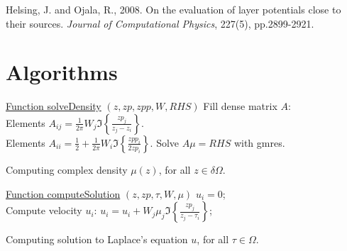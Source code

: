 \documentclass[a4paper,10pt]{article}
\begin{document}
\newpage
\begin{thebibliography}{99}
    Helsing, J. and Ojala, R., 2008. On the evaluation of layer potentials close to their sources. {\em Journal of Computational Physics}, 227(5), pp.2899-2921.
\end{thebibliography}

\newpage
\appendix
\section{Algorithms}
\label{sec:alg}
\begin{algorithm}[ht]

    \underline{Function solveDensity} $(z,zp,zpp,W, RHS)$\;
    \Output{$\mu$}
     {
         {
            Fill dense matrix $A$: \\
                Elements $A_{ij} = \frac{1}{2\pi} W_j \Im\left\{ \frac{zp_j}{z_j - z_i} \right\}$. \\
                Elements $A_{ii} = \frac{1}{2} + \frac{1}{2\pi}W_i \Im\left\{ \frac{zpp_i}{2zp_i} \right\}$.
        }
    }
    Solve $A\mu=RHS$ with gmres.
    \caption{Computing complex density $\mu(z)$, for all $z\in\delta\Omega$.}
    \label{alg:solveDensity}
\end{algorithm}
\begin{algorithm}[ht]

    \underline{Function computeSolution} $(z,zp,\tau,W,\mu)$\;
     {
        $u_i = 0$; \\
         {
            Compute velocity $u_i$: 
            $u_i = u_i + W_j\mu_j\Im\left\{ \frac{zp_j}{z_j-\tau_i} \right\}$;
        }
    }
    \caption{Computing solution to Laplace's equation $u$, for all $\tau\in\Omega$.}
    \label{alg:compU}
\end{algorithm}
\end{document}
